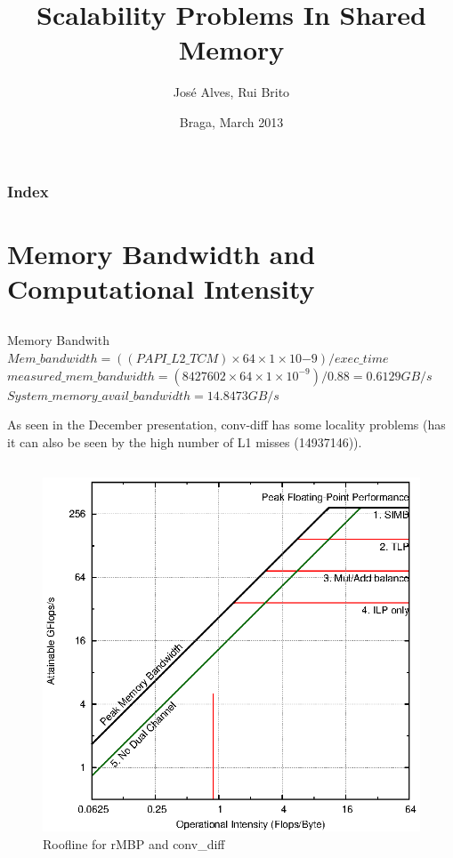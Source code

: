 \documentclass{beamer}
\title{Scalability Problems In Shared Memory}
\author{José Alves, Rui Brito}
\institute[pg22765, pg22781]{
	Universidade do Minho
}
\date{Braga, March 2013}
\begin{document}

\maketitle%

\begin{frame}
	\frametitle{Index}
	\tableofcontents
\end{frame}


\section{Memory Bandwidth and Computational Intensity}
\subsection{}
\small
\begin{frame}
\begin{block}{Memory Bandwith}
	$Mem\_bandwidth = ((PAPI\_L2\_TCM) \times 64 \times 1 \times 10{-9}) / exec\_time$
	$measured\_mem\_bandwidth = (8427602 \times 64 \times 1 \times 10^{-9})/0.88 = 0.6129 GB/s$\\
	$System\_memory\_avail\_bandwidth = 14.8473 GB/s$
\end{block}
As seen in the December presentation, conv-diff has some locality problems (has it can also be seen by the high number of L1 misses (14937146)).
\end{frame}

\subsection{}
\begin{frame}[fragile]
		\begin{figure}[!htb]
			\centering
			\includegraphics[scale=.7]{roofline_mbp.eps}
			\caption{Roofline for rMBP and conv\_diff}
			\label{roofline}
		\end{figure}
\end{frame}
\end{document}
